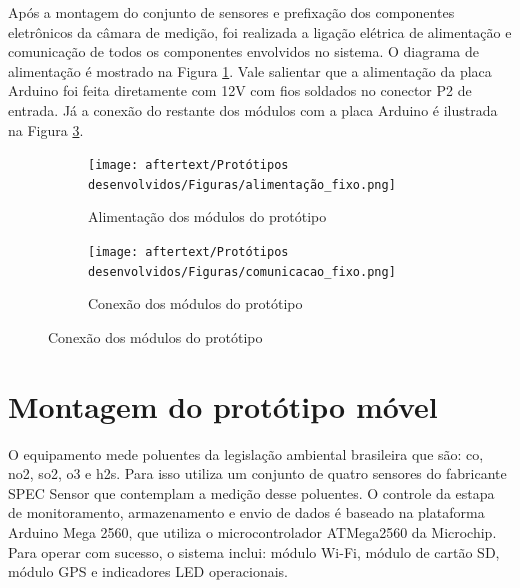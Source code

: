 Após a montagem do conjunto de sensores e prefixação dos componentes eletrônicos da câmara de medição, foi realizada a ligação elétrica de alimentação e comunicação de todos os componentes envolvidos no sistema. O diagrama de alimentação é mostrado na Figura \ref{fig:fixed-modules-power-supply}. Vale salientar que a alimentação da placa Arduino foi feita diretamente com 12V com fios soldados no conector P2 de entrada. Já a conexão do restante dos módulos com a placa Arduino é ilustrada na Figura \ref{fig:fixed-modules-connections}.

\begin{figure}[h]
    \centering
    \caption{Diagrama de conexões do conjunto de sensores Alphasense}
    \begin{subfigure}{0.495\textwidth}
        \centering
        \texttt{[image: aftertext/Protótipos desenvolvidos/Figuras/alimentação\_fixo.png]}
        \caption{Alimentação dos módulos do protótipo}
        \label{fig:fixed-modules-power-supply}
    \end{subfigure}
    \hfill
    \begin{subfigure}{0.495\textwidth}
        \centering
        \texttt{[image: aftertext/Protótipos desenvolvidos/Figuras/comunicacao\_fixo.png]}
        \caption{Conexão dos módulos do protótipo}
        \label{fig:fixed-modules-connections}
    \end{subfigure}
\end{figure}

\section{Montagem do protótipo móvel}

O equipamento mede poluentes da legislação ambiental brasileira \cite{BRASIL.MINISTERIODOMEIOAMBIENTEMMA.ConselhoNacionaldoMeioAmbienteCONAMA2018ResolucaoAr.} que são: \acrshort{co}, \acrshort{no2}, \acrshort{so2}, \acrshort{o3} e \acrshort{h2s}. Para isso utiliza um conjunto de quatro sensores do fabricante SPEC Sensor que contemplam a medição desse poluentes. O controle da estapa de monitoramento, armazenamento e envio de dados é baseado na plataforma Arduino Mega 2560, que utiliza o microcontrolador ATMega2560 da Microchip. Para operar com sucesso, o sistema inclui: módulo Wi-Fi, módulo de cartão SD, módulo GPS e indicadores LED operacionais.